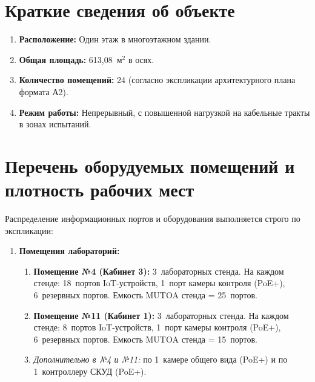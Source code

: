 \documentclass[a4paper,oneside,14pt]{extreport}
\begin{document}
\begin{appendices}
\section{Краткие сведения об объекте}
\begin{enumerate}[label=\arabic{section}.\arabic*]
    \item \textbf{Расположение:} Один этаж в многоэтажном здании.
    \item \textbf{Общая площадь:} 613,08~м$^2$ в осях.
    \item \textbf{Количество помещений:} 24 (согласно экспликации архитектурного плана формата А2).
    \item \textbf{Режим работы:} Непрерывный, с повышенной нагрузкой на кабельные тракты в зонах испытаний.
\end{enumerate}

\section{Перечень оборудуемых помещений и плотность рабочих мест}
Распределение информационных портов и оборудования выполняется строго по экспликации:

\begin{enumerate}[label=\arabic{section}.\arabic*]
    \item \textbf{Помещения лабораторий:}
    \begin{enumerate}[label=\arabic{section}.\arabic{enumi}.\arabic*]
        \item \textbf{Помещение №4 (Кабинет 3):} 3~лабораторных стенда. На каждом стенде: 18~портов IoT-устройств, 1~порт камеры контроля (PoE+), 6~резервных портов. Емкость MUTOA стенда = 25~портов.
        \item \textbf{Помещение №11 (Кабинет 1):} 3~лабораторных стенда. На каждом стенде: 8~портов IoT-устройств, 1~порт камеры контроля (PoE+), 6~резервных портов. Емкость MUTOA стенда = 15~портов.
        \item \textit{Дополнительно в №4 и №11:} по 1~камере общего вида (PoE+) и по 1~контроллеру СКУД (PoE+).
    \end{enumerate}


\end{enumerate}
\end{appendices}
\end{document}
